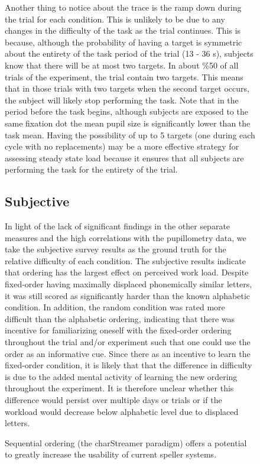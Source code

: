 \documentclass[10pt]{article}
\begin{document}
\begin{figure}
Another thing to notice about the trace is the ramp down during the
trial for each condition.  This is unlikely to be due to any changes in
the difficulty of the task as the trial continues. This is because, although
the probability of having a target is symmetric about the entirety of
the task period of the trial (13 - 36 s), subjects know that there will be at
most two targets.  In about \%50 of all trials of
the experiment, the trial contain two targets. This means that 
in those trials with two targets when the second target occurs, the subject will likely stop
performing the task.  Note that in the period before the task
begins, although subjects are exposed to the same fixation dot the
mean pupil size is significantly lower than the task mean.  
Having the possibility of up to 5 targets (one during each
cycle with no replacements) may be a more effective strategy
for assessing steady state load because it ensures that all
subjects are performing the task for the entirety of the trial.

\subsection{Subjective}
In light of the lack of significant findings in the other separate
measures and the high correlations with the pupillometry data, we take the subjective survey results as the ground
truth for the relative
difficulty of each condition.  The subjective results indicate that
ordering has the largest effect on perceived work load. Despite
fixed-order having maximally displaced phonemically similar letters,
it was still scored as significantly harder than the known
alphabetic condition.  In addition, the random condition was rated
more difficult than the alphabetic ordering, indicating that there
was incentive for familiarizing oneself with the fixed-order
ordering throughout the trial and/or experiment such that one could
use the order as an informative cue.  Since there as an incentive to
learn the fixed-order condition, it is likely that that the
difference in difficulty is due to the added mental activity of
learning the new ordering throughout the experiment. It is therefore
unclear whether this difference would persist over multiple days or
trials or if the workload would decrease below alphabetic level due
to displaced letters.

Sequential ordering (the charStreamer paradigm) offers a potential to
greatly increase the usability of current speller systems.


\end{figure}
\end{document}
